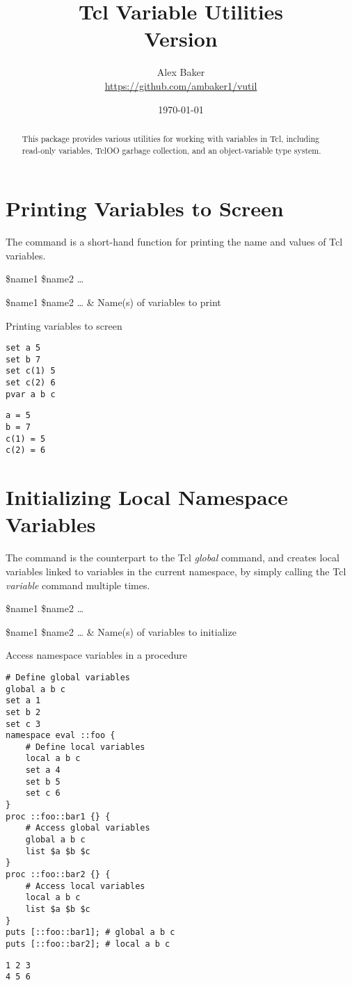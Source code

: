 \documentclass{article}
\title{\Huge Tcl Variable Utilities\\\small Version \version}
\author{Alex Baker\\\small\url{https://github.com/ambaker1/vutil}}
\date{\small\today}
\begin{document}
\maketitle
\begin{abstract}
\begin{center}
This package provides various utilities for working with variables in Tcl, including read-only variables, TclOO garbage collection, and an object-variable type system.
\end{center}
\end{abstract}
\clearpage
\section{Printing Variables to Screen} 
The  command is a short-hand function for printing the name and values of Tcl variables.
\begin{syntax}
 \$name1 \$name2 …
\end{syntax}
\begin{args}
\$name1 \$name2 … & Name(s) of variables to print
\end{args}

\begin{example}{Printing variables to screen}
\begin{lstlisting}
set a 5
set b 7
set c(1) 5
set c(2) 6
pvar a b c
\end{lstlisting}
\tcblower
\begin{lstlisting}
a = 5
b = 7
c(1) = 5
c(2) = 6
\end{lstlisting}
\end{example}
\clearpage
\section{Initializing Local Namespace Variables}
The command  is the counterpart to the Tcl \textit{global} command, and creates local variables linked to variables in the current namespace, by simply calling the Tcl \textit{variable} command multiple times.
\begin{syntax}
 \$name1 \$name2 …
\end{syntax}
\begin{args}
\$name1 \$name2 … & Name(s) of variables to initialize
\end{args}
\begin{example}{Access namespace variables in a procedure}
\begin{lstlisting}
# Define global variables
global a b c
set a 1
set b 2
set c 3
namespace eval ::foo {
    # Define local variables
    local a b c
    set a 4
    set b 5
    set c 6
}
proc ::foo::bar1 {} {
    # Access global variables
    global a b c
    list $a $b $c
}
proc ::foo::bar2 {} {
    # Access local variables
    local a b c
    list $a $b $c
}
puts [::foo::bar1]; # global a b c
puts [::foo::bar2]; # local a b c
\end{lstlisting}
\tcblower
\begin{lstlisting}
1 2 3
4 5 6
\end{lstlisting}
\end{example}
\end{document}
